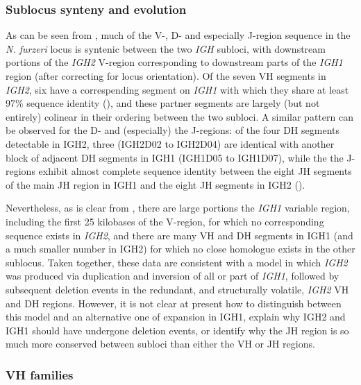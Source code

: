 	\subsubsection{Sublocus synteny and evolution}
	\label{sec:nfu-locus-variable-synteny}

		As can be seen from , much of the V-, D- and especially J-region sequence in the \textit{N. furzeri} locus is syntenic between the two \textit{IGH} subloci, with downstream portions of the \textit{IGH2} V-region corresponding to downstream parts of the \textit{IGH1} region (after correcting for locus orientation). Of the seven VH segments in \textit{IGH2}, six have a correspending segment on \textit{IGH1} with which they share at least 97\% sequence identity (), and these partner segments are largely (but not entirely) colinear in their ordering between the two subloci. A similar pattern can be observed for the D- and (especially) the J-regions: of the four DH segments detectable in IGH2, three (IGH2D02 to IGH2D04) are identical with another block of adjacent DH segments in IGH1 (IGH1D05 to IGH1D07), while the the J-regions exhibit almost complete sequence identity between the eight JH segments of the main JH region in IGH1 and the eight JH segments in IGH2 ().
		
		Nevertheless, as is clear from , there are large portions the \textit{IGH1} variable region, including the first 25 kilobases of the V-region, for which no corresponding sequence exists in \textit{IGH2}, and there are many VH and DH segments in IGH1 (and a much smaller number in IGH2) for which no close homologue exists in the other sublocus. Taken together, these data are consistent with a model in which \textit{IGH2} was produced via duplication and inversion of all or part of \textit{IGH1}, followed by subsequent deletion events in the redundant, and structurally volatile, \textit{IGH2} VH and DH regions. However, it is not clear at present how to distinguish between this model and an alternative one of expansion in IGH1, explain why IGH2 and IGH1 should have undergone deletion events, or identify why the JH region is so much more conserved between subloci than either the VH or JH regions.
		

	\subsubsection{VH families}
	\label{sec:nfu-locus-variable-families}
	
